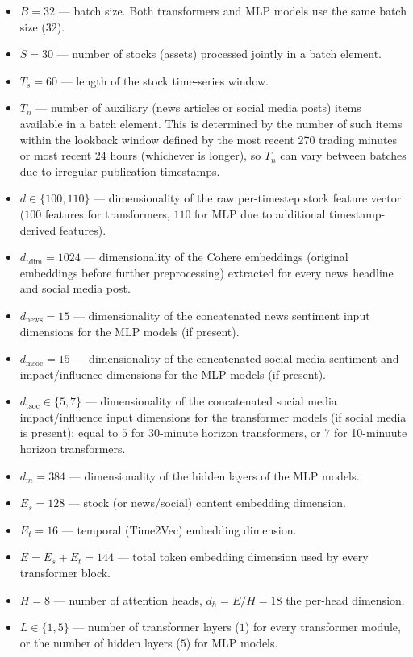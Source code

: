 \documentclass[stu,floatsintext]{apa7}
\begin{document}
\begin{itemize}[leftmargin=2em]
  \item $B=32$ — batch size. Both transformers and MLP models use the same batch size ($32$).
  \item $S=30$ — number of stocks (assets) processed jointly in a batch element.
  \item $T_s=60$ — length of the stock time-series window.
  \item $T_n$ — number of auxiliary (news articles or social media posts) items available in a batch element. This is determined by the number of such items within the lookback window defined by the most recent 270 trading minutes or most recent 24 hours (whichever is longer), so $T_n$ can vary between batches due to irregular publication timestamps.
  \item $d\in\{100,110\}$ — dimensionality of the raw per-timestep stock feature vector ($100$ features for transformers, $110$ for MLP due to additional timestamp-derived features).
  \item $d_{\text{tdim}}=1024$ — dimensionality of the Cohere embeddings (original embeddings before further preprocessing) extracted for every news headline and social media post.
  \item $d_{\text{news}}=15$ — dimensionality of the concatenated news sentiment input dimensions for the MLP models (if present).
  \item $d_{\text{msoc}}=15$ — dimensionality of the concatenated social media sentiment and impact/influence dimensions for the MLP models (if present).
  \item $d_{\text{tsoc}}\in\{5,7\}$ — dimensionality of the concatenated social media impact/influence input dimensions for the transformer models (if social media is present): equal to $5$ for 30-minute horizon transformers, or $7$ for 10-minuute horizon transformers.
  \item $d_m=384$ — dimensionality of the hidden layers of the MLP models.
  \item $E_s=128$ — stock (or news/social) content embedding dimension.
  \item $E_t=16$ — temporal (Time2Vec) embedding dimension.
  \item $E = E_s + E_t = 144$ — total token embedding dimension used by every transformer block.
  \item $H=8$ — number of attention heads, $d_h = E/H = 18$ the per-head dimension.
  \item $L\in\{1,5\}$ — number of transformer layers ($1$) for every transformer module, or the number of hidden layers ($5$) for MLP models. 

\end{itemize}
\end{document}
